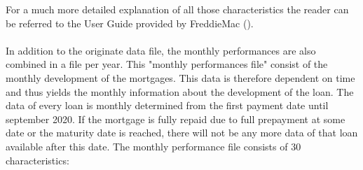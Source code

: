     For a much more detailed explanation of all those characteristics 
    the reader can be referred to the User Guide provided by FreddieMac (\cite{FredieMac}). 
    \\\\
    In addition to the originate data file, the monthly performances
    are also combined in a file per year. This "monthly performances file" 
    consist of the monthly development of the mortgages.  
    This data is therefore dependent on time and thus yields the monthly 
    information about the development of the loan. 
    The data of every loan is monthly determined from the first payment 
    date until september 2020. If the mortgage is fully repaid due to 
    full prepayment at some date or the maturity date is reached, 
    there will not be any more data of that loan available after this date.  
    The monthly performance file consists of 30 characteristics: 
